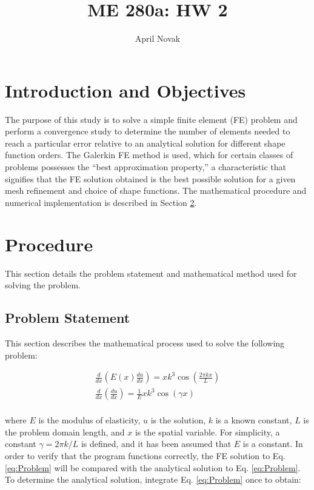 \documentclass[10pt]{article}
\begin{document}
\title{ME 280a: HW 2}
\author{April Novak}

\maketitle

\section{Introduction and Objectives}

The purpose of this study is to solve a simple finite element (FE) problem and perform a convergence study to determine the number of elements needed to reach a particular error relative to an analytical solution for different shape function orders. The Galerkin FE method is used, which for certain classes of problems possesses the ``best approximation property,'' a characteristic that signifies that the FE solution obtained is the best possible solution for a given mesh refinement and choice of shape functions. The mathematical procedure and numerical implementation is described in Section \ref{sec:Procedure}.

\section{Procedure}
\label{sec:Procedure}

This section details the problem statement and mathematical method used for solving the problem.

\subsection{Problem Statement}

This section describes the mathematical process used to solve the following problem:

\begin{equation}
\label{eq:Problem}
\begin{aligned}
\frac{d}{dx}\left(E(x)\frac{du}{dx}\right)=xk^3\cos{\left(\frac{2\pi kx}{L}\right)}\\
\frac{d}{dx}\left(\frac{du}{dx}\right)=\frac{1}{E}xk^3\cos{(\gamma x)}\\
\end{aligned}
\end{equation}

where \(E\) is the modulus of elasticity, \(u\) is the solution, \(k\) is a known constant, \(L\) is the problem domain length, and \(x\) is the spatial variable. For simplicity, a constant \(\gamma=2\pi k/L\) is defined, and it has been assumed that \(E\) is a constant. In order to verify that the program functions correctly, the FE solution to Eq. \eqref{eq:Problem} will be compared with the analytical solution to Eq. \eqref{eq:Problem}. To determine the analytical solution, integrate Eq. \eqref{eq:Problem} once to obtain:
\end{document}
